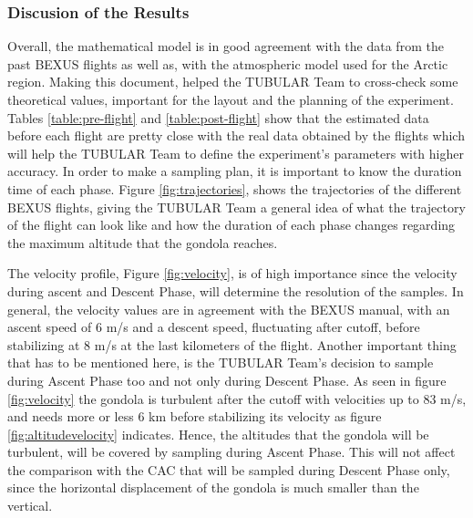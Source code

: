 \documentclass[a4paper,12pt,twoside]{article}
\begin{document}
\begin{appendices}
\subsubsection{Discusion of the Results}
Overall, the mathematical model is in good agreement with the data from the past BEXUS flights as well as, with the atmospheric model used for the Arctic region.
Making this document, helped the TUBULAR Team to cross-check some theoretical values, important for the layout and the planning of the experiment. Tables \ref{table:pre-flight} and \ref{table:post-flight} show that the estimated data before each flight are pretty close with the real data obtained by the flights which will help the TUBULAR Team to define the experiment's parameters with higher accuracy. 
In order to make a sampling plan, it is important to know the duration time of each phase. Figure \ref{fig:trajectories}, shows the trajectories of the different BEXUS flights, giving the TUBULAR Team a general idea of what the trajectory of the flight can look like and how the duration of each phase changes regarding the maximum altitude that the gondola reaches.

The velocity profile, Figure \ref{fig:velocity}, is of high importance since the velocity during ascent and Descent Phase, will determine the resolution of the samples. In general, the velocity values are in agreement with the BEXUS manual, with an ascent speed of 6 m/s and a descent speed, fluctuating after cutoff, before stabilizing at 8 m/s at the last kilometers of the flight. Another important thing that has to be mentioned here, is the TUBULAR Team's decision to sample during Ascent Phase too and not only during Descent Phase. As seen in figure \ref{fig:velocity} the gondola is turbulent after the cutoff with velocities up to 83 m/s, and needs more or less 6 km before stabilizing its velocity as figure \ref{fig:altitudevelocity} indicates. Hence, the altitudes that the gondola will be turbulent, will be covered by sampling during Ascent Phase. This will not affect the comparison with the CAC that will be sampled during Descent Phase only, since the horizontal displacement of the gondola is much smaller than the vertical. 


\end{appendices}
\end{document}
